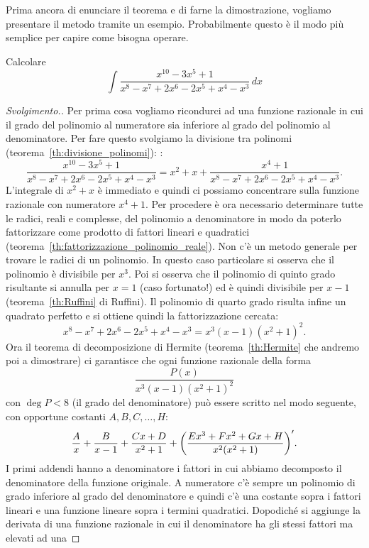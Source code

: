 Prima ancora di enunciare il teorema e di farne la dimostrazione,
vogliamo presentare il metodo tramite un esempio. Probabilmente questo è il modo più semplice per capire come bisogna operare.

\begin{example}
  Calcolare
  \[
   \int \frac{x^{10}-3x^5+1}{x^8-x^7+2x^6-2x^5+x^4-x^3}\, dx
  \]
\end{example}
\begin{proof}[Svolgimento.]
Per prima cosa vogliamo ricondurci ad una funzione razionale
in cui il grado del polinomio al numeratore sia inferiore
al grado del polinomio al denominatore. Per fare questo svolgiamo
la divisione tra polinomi
(teorema~\ref{th:divisione_polinomi}):
:
\[
  \frac{x^{10}-3x^5+1}{x^8-x^7+2x^6-2x^5+x^4-x^3}
  = x^2 + x + \frac{x^4+1}{x^8-x^7+2x^6-2x^5+x^4-x^3}.
\]
L'integrale di $x^2+x$ è immediato e quindi ci possiamo concentrare
sulla funzione razionale con numeratore $x^4+1$.
Per procedere è ora necessario determinare tutte le radici, reali e complesse, del polinomio a denominatore in modo da poterlo fattorizzare
come prodotto di fattori lineari e quadratici
(teorema~\ref{th:fattorizzazione_polinomio_reale}).
Non c'è un metodo generale per trovare le radici di un polinomio.
In questo caso particolare si osserva
che il polinomio è divisibile per $x^3$. Poi si osserva che il polinomio
di quinto grado risultante si annulla per $x=1$ (caso fortunato!) ed
è quindi divisibile per $x-1$ (teorema~\ref{th:Ruffini} di Ruffini).
Il polinomio di quarto grado
risulta infine un quadrato perfetto e si ottiene quindi la fattorizzazione
cercata:
\[
x^8-x^7+2x^6-2x^5+x^4-x^3 = x^3(x-1)(x^2+1)^2.
\]
Ora il teorema di decomposizione di Hermite (teorema~\ref{th:Hermite} che andremo poi a dimostrare)
ci garantisce che ogni funzione razionale della forma
\[
\frac{P(x)}{x^3(x-1)(x^2+1)^2}
\]
con $\deg P < 8$ (il grado del denominatore) può essere
scritto nel modo seguente, con
opportune costanti $A,B,C,\dots,H$:
\begin{equation}\label{eq:438943}
  \frac{A}{x} + \frac{B}{x-1} + \frac{Cx+D}{x^2+1}
  + {\left( \frac{Ex^3 + Fx^2 + G x + H}{x^2(x^2+1)} \right)}'.
\end{equation}
I primi addendi hanno a denominatore i fattori in cui abbiamo
decomposto il denominatore della funzione originale. A numeratore
c'è sempre un polinomio di grado inferiore al grado del denominatore
e quindi c'è una costante sopra i fattori lineari e una funzione lineare
sopra i termini quadratici. Dopodiché si aggiunge la derivata di una funzione
razionale in cui il denominatore ha gli stessi fattori ma elevati ad una

\end{proof}
